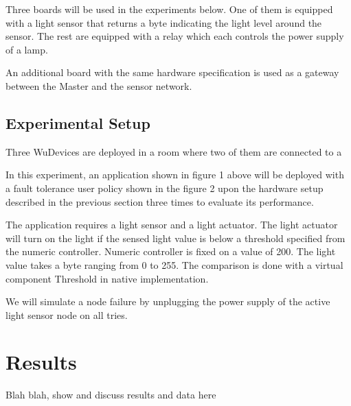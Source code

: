 Three boards will be used in the experiments below. One of them is equipped with a light sensor that returns a byte indicating the light level around the sensor. The rest are equipped with a relay which each controls the power supply of a lamp.

An additional board with the same hardware specification is used as a gateway between the Master and the sensor network.

\subsection{Experimental Setup}

Three WuDevices are deployed in a room where two of them are connected to a 


In this experiment, an application shown in figure 1 above will be deployed with a fault tolerance user policy shown in the figure 2 upon the hardware setup described in the previous section three times to evaluate its performance.

The application requires a light sensor and a light actuator. The light actuator will turn on the light if the sensed light value is below a threshold specified from the numeric controller. Numeric controller is fixed on a value of 200. The light value takes a byte ranging from 0 to 255. The comparison is done with a virtual component Threshold in native implementation.

We will simulate a node failure by unplugging the power supply of the active light sensor node on all tries.

\section{Results}
\label{s:results}

Blah blah, show and discuss results and data here
